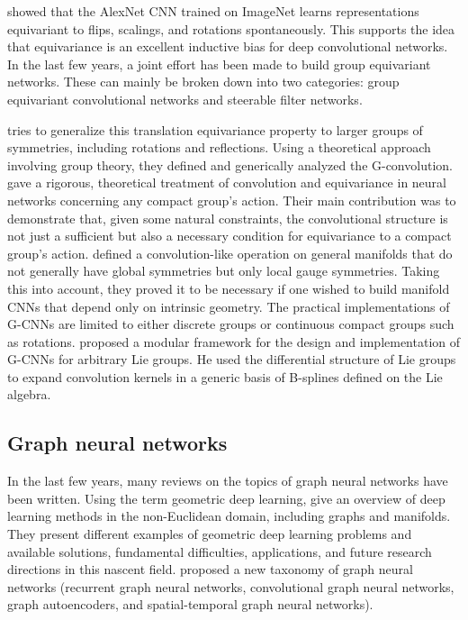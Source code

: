 \documentclass{article}
\begin{document}
\citet{lenc2015understanding} showed that the AlexNet CNN \citet{krizhevsky2012imagenet} trained on ImageNet learns representations equivariant to flips, scalings, and rotations spontaneously. This supports the idea that equivariance is an excellent inductive bias for deep convolutional networks. In the last few years, a joint effort has been made to build group equivariant networks. These can mainly be broken down into two categories: group equivariant convolutional networks and steerable filter networks. 

\citet{cohen2016gcnn} tries to generalize this translation equivariance property to larger groups of symmetries, including rotations and reflections. Using a theoretical approach involving group theory, they defined and generically analyzed the G-convolution. \citet{kondor2018generalization} gave a rigorous, theoretical treatment of convolution and equivariance in neural networks concerning any compact group's action. Their main contribution was to demonstrate that, given some natural constraints, the convolutional structure is not just a sufficient but also a necessary condition for equivariance to a compact group's action. \citet{cohen2019gauge} defined a convolution-like operation on general manifolds that do not generally have global symmetries but only local gauge symmetries. Taking this into account, they proved it to be necessary if one wished to build manifold CNNs that depend only on intrinsic geometry. The practical implementations of G-CNNs are limited to either discrete groups or continuous compact groups such as rotations. \citet{bekkers2019b} proposed a modular framework for the design and implementation of G-CNNs for arbitrary Lie groups. He used the differential structure of Lie groups to expand convolution kernels in a generic basis of B-splines defined on the Lie algebra.

\subsection{Graph neural networks}

In the last few years, many reviews on the topics of graph neural networks have been written. Using the term geometric deep learning, \citet{bronstein2017geometric} give an overview of deep learning methods in the non-Euclidean domain, including graphs and manifolds. They present different examples of geometric deep learning problems and available solutions, fundamental difficulties, applications, and future research directions in this nascent field. \citet{wu2020comprehensive} proposed a new taxonomy of graph neural networks (recurrent graph neural networks, convolutional graph neural networks, graph autoencoders, and spatial-temporal graph neural networks).
\end{document}
